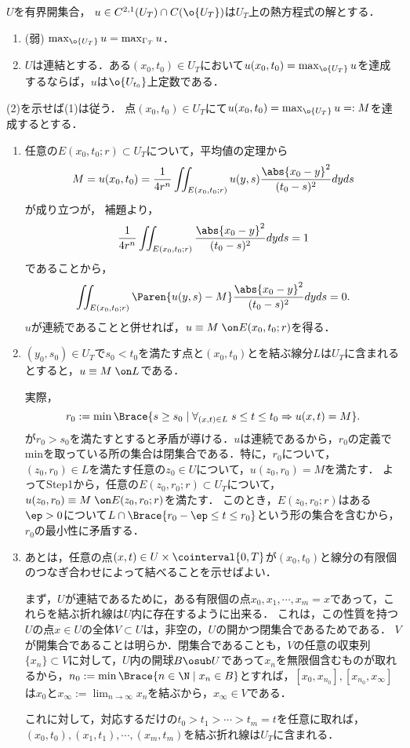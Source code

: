 \documentclass[uplatex,dvipdfmx]{jsreport}
\begin{document}
\begin{theorem}[熱方程式に対する最大値原理]
    $U$を有界開集合，
    $u\in C^{2,1}(U_T)\cap C(\o{U_T})$は$U_T$上の熱方程式の解とする．
    \begin{enumerate}
        \item (弱) $\max_{\o{U_T}}u=\max_{\Gamma_T}u$．
        \item $U$は連結とする．ある$(x_0,t_0)\in U_T$において$u(x_0,t_0)=\max_{\o{U_T}}u$を達成するならば，$u$は$\o{U_{t_0}}$上定数である．
    \end{enumerate}
\end{theorem}
\begin{Proof}
    (2)を示せば(1)は従う．
    点$(x_0,t_0)\in U_T$にて$u(x_0,t_0)=\max_{\o{U_T}}u=:M$を達成するとする．
    \begin{enumerate}[{Step}1]
        \item 任意の$E(x_0,t_0;r)\subset U_T$について，平均値の定理から
        \[M=u(x_0,t_0)=\frac{1}{4r^n}\iint_{E(x_0,t_0;r)}u(y,s)\frac{\abs{x_0-y}^2}{(t_0-s)^2}dyds\]
        が成り立つが，
        補題より，
        \[\frac{1}{4r^n}\iint_{E(x_0,t_0;r)}\frac{\abs{x_0-y}^2}{(t_0-s)^2}dyds=1\]
        であることから，
        \[\iint_{E(x_0,t_0;r)}\Paren{u(y,s)-M}\frac{\abs{x_0-y}^2}{(t_0-s)^2}dyds=0.\]
        $u$が連続であることと併せれば，$u\equiv M\;\on E(x_0,t_0;r)$を得る．
        \item $(y_0,s_0)\in U_T$で$s_0<t_0$を満たす点と$(x_0,t_0)$とを結ぶ線分$L$は$U_T$に含まれるとすると，$u\equiv M\;\on L$である．
        
        実際，
        \[r_0:=\min\Brace{s\ge s_0\mid \forall_{(x,t)\in L}\;s\le t\le t_0\Rightarrow u(x,t)=M}.\]
        が$r_0>s_0$を満たすとすると矛盾が導ける．$u$は連続であるから，$r_0$の定義でminを取っている所の集合は閉集合である．特に，$r_0$について，
        $(z_0,r_0)\in L$を満たす任意の$z_0\in U$について，$u(z_0,r_0)=M$を満たす．
        よってStep1から，任意の$E(z_0,r_0;r)\subset U_T$について，$u(z_0,r_0)\equiv M\;\on E(z_0,r_0;r)$を満たす．
        このとき，$E(z_0,r_0;r)$はある$\ep>0$について$L\cap\Brace{r_0-\ep\le t\le r_0}$という形の集合を含むから，$r_0$の最小性に矛盾する．
        \item あとは，任意の点$(x,t)\in U\times\cointerval{0,T}$が$(x_0,t_0)$と線分の有限個のつなぎ合わせによって結べることを示せばよい．
        
        まず，$U$が連結であるために，ある有限個の点$x_0,x_1,\cdots,x_m=x$であって，これらを結ぶ折れ線は$U$内に存在するように出来る．
        これは，この性質を持つ$U$の点$x\in U$の全体$V\subset U$は，非空の，$U$の開かつ閉集合であるためである．
        $V$が開集合であることは明らか．閉集合であることも，$V$の任意の収束列$\{x_n\}\subset V$に対して，$U$内の開球$B\osub U$であって$x_n$を無限個含むものが取れるから，$n_0:=\min\Brace{n\in\N\mid x_n\in B}$とすれば，$[x_0,x_{n_0}],[x_{n_0},x_\infty]$は$x_0$と$x_\infty:=\lim_{n\to\infty}x_n$を結ぶから，$x_\infty\in V$である．

        これに対して，対応するだけの$t_0>t_1>\cdots>t_m=t$を任意に取れば，$(x_0,t_0),(x_1,t_1),\cdots,(x_m,t_m)$を結ぶ折れ線は$U_T$に含まれる．
    \end{enumerate}
\end{Proof}
\end{document}

